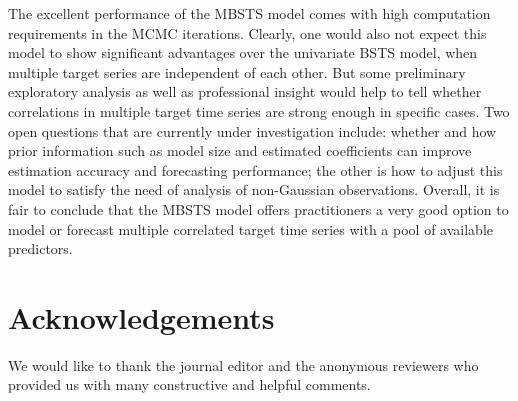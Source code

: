 \documentclass[twoside,11pt]{article}
\begin{document}
The excellent performance of the MBSTS model comes with high computation requirements in the MCMC iterations. Clearly, one would also not expect this model to show significant advantages over the univariate BSTS model, when multiple target series are independent of each other. But some preliminary exploratory analysis as well as professional insight would help to tell whether
correlations in multiple target time series are strong enough in specific cases.  Two open questions that are currently under investigation include: %
whether and how prior information such as model size and estimated coefficients can improve estimation accuracy and forecasting performance; the other is how to adjust this model to satisfy the need of analysis of non-Gaussian observations. Overall, it is fair to conclude that the MBSTS model offers practitioners a very good option to model or forecast multiple correlated target time series with a pool of available predictors.

\section*{Acknowledgements}
We would like to thank the journal editor and the anonymous reviewers who
provided us with many constructive and helpful comments.

\vskip 0.2in

\end{document}
